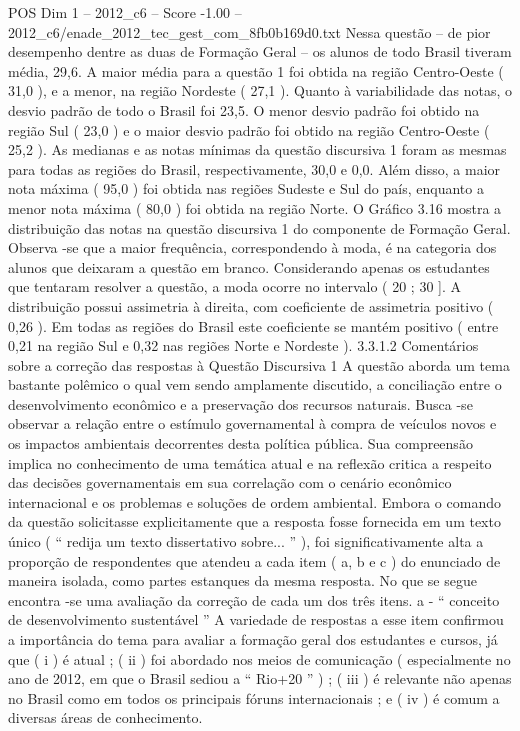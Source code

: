 \begin{textsample}{POS Dim 1 – 2012\_c6 – Score -1.00 – 2012\_c6/enade\_2012\_tec\_gest\_com\_8fb0b169d0.txt}
Nessa questão – de pior desempenho dentre as duas de Formação Geral – os alunos de todo Brasil tiveram média, 29,6.
A maior média para a questão 1 foi obtida na região Centro-Oeste ( 31,0 ), e a menor, na região Nordeste ( 27,1 ).
Quanto à variabilidade das notas, o desvio padrão de todo o Brasil foi 23,5.
O menor desvio padrão foi obtido na região Sul ( 23,0 ) e o maior desvio padrão foi obtido na região Centro-Oeste ( 25,2 ).
As medianas e as notas mínimas da questão discursiva 1 foram as mesmas para todas as regiões do Brasil, respectivamente, 30,0 e 0,0.
Além disso, a maior nota máxima ( 95,0 ) foi obtida nas regiões Sudeste e Sul do país, enquanto a menor nota máxima ( 80,0 ) foi obtida na região Norte.
O Gráfico 3.16 mostra a distribuição das notas na questão discursiva 1 do componente de Formação Geral.
Observa -se que a maior frequência, correspondendo à moda, é na categoria dos alunos que deixaram a questão em branco.
Considerando apenas os estudantes que tentaram resolver a questão, a moda ocorre no intervalo ( 20 ; 30 ].
A distribuição possui assimetria à direita, com coeficiente de assimetria positivo ( 0,26 ).
Em todas as regiões do Brasil este coeficiente se mantém positivo ( entre 0,21 na região Sul e 0,32 nas regiões Norte e Nordeste ). 3.3.1.2 Comentários sobre a correção das respostas à Questão Discursiva 1 A questão aborda um tema bastante polêmico o qual vem sendo amplamente discutido, a conciliação entre o desenvolvimento econômico e a preservação dos recursos naturais.
Busca -se observar a relação entre o estímulo governamental à compra de veículos novos e os impactos ambientais decorrentes desta política pública.
Sua compreensão implica no conhecimento de uma temática atual e na reflexão critica a respeito das decisões governamentais em sua correlação com o cenário econômico internacional e os problemas e soluções de ordem ambiental.
Embora o comando da questão solicitasse explicitamente que a resposta fosse fornecida em um texto único ( “ redija um texto dissertativo sobre... ” ), foi significativamente alta a proporção de respondentes que atendeu a cada item ( a, b e c ) do enunciado de maneira isolada, como partes estanques da mesma resposta.
No que se segue encontra -se uma avaliação da correção de cada um dos três itens. a - “ conceito de desenvolvimento sustentável ” A variedade de respostas a esse item confirmou a importância do tema para avaliar a formação geral dos estudantes e cursos, já que ( i ) é atual ; ( ii ) foi abordado nos meios de comunicação ( especialmente no ano de 2012, em que o Brasil sediou a “ Rio+20 ” ) ; ( iii ) é relevante não apenas no Brasil como em todos os principais fóruns internacionais ; e ( iv ) é comum a diversas áreas de conhecimento.

\end{textsample}
